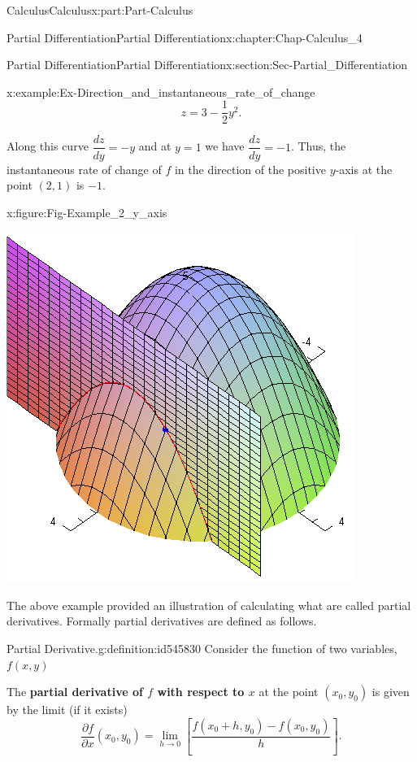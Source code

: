 \documentclass[oneside,10pt,]{book}
\newcommand{\terminology}[1]{\textbf{#1}}
\numberwithin{equation}{section}
\begin{document}
\begin{partptx}{Calculus}{}{Calculus}{}{}{x:part:Part-Calculus}
\begin{chapterptx}{Partial Differentiation}{}{Partial Differentiation}{}{}{x:chapter:Chap-Calculus_4}
\begin{sectionptx}{Partial Differentiation}{}{Partial Differentiation}{}{}{x:section:Sec-Partial_Differentiation}
\begin{example}{}{x:example:Ex-Direction_and_instantaneous_rate_of_change}
\begin{equation*}
z=3-\frac{1}{2}y^2\text{.}
\end{equation*}
%
\par
Along this curve \(\dfrac{dz}{dy}=-y\) and at \(y=1\) we have \(\dfrac{dz}{dy}=-1\). Thus, the instantaneous rate of change of \(f\) in the direction of the positive \(y\)-axis at the point \((2,1)\) is \(-1\).%
\begin{figureptx}{}{x:figure:Fig-Example_2_y_axis}{}%
\begin{image}{0.15}{0.7}{0.15}%
\includegraphics[width=\linewidth]{./Calculus/Images/4/Ex2_y_axis_rate_of_change.png}
\end{image}%
\tcblower
\end{figureptx}%
\end{example}
The above example provided an illustration of calculating what are called partial derivatives. Formally partial derivatives are defined as follows.%
\begin{definition}{Partial Derivative.}{g:definition:id545830}%
Consider the function of two variables, \(f(x,y)\)%
\par
The \terminology{partial derivative of \(f\) with respect to \(x\)} at the point \((x_0,y_0)\) is given by the limit (if it exists)%
\begin{equation*}
\frac{\partial f}{\partial x} (x_0,y_0) = \lim_{h \to 0} \left[ \frac{f(x_0+h,y_0)-f(x_0,y_0)}{h} \right]\text{.}

\end{equation*}
\end{definition}
\end{sectionptx}
\end{chapterptx}
\end{partptx}
\end{document}

